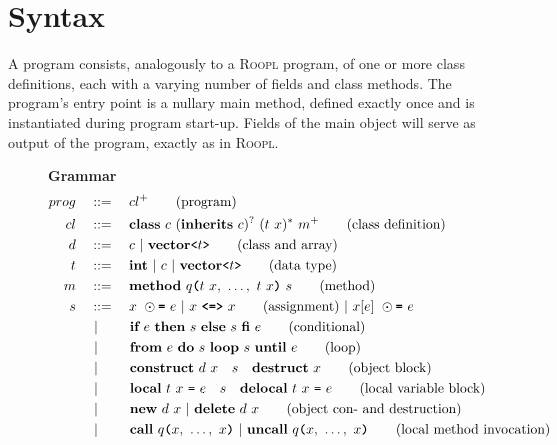 \section{Syntax}
\label{sec:syntax}
A \rooplpp program consists, analogously to a \textsc{Roopl} program, of one or more class definitions, each with a varying number of fields and class methods. The program's entry point is a nullary main method, defined exactly once and is instantiated during program start-up. Fields of the main object will serve as output of the program, exactly as in \textsc{Roopl}.
\begin{figure}[h]
\centering
\vspace{3mm}
\textbf{\rooplpp Grammar}
\begin{align}
    prog		\quad&::= \quad cl^+ \tag{program}\\
    cl			\quad&::=\quad \textbf{class}\ c\ (\textbf{inherits}\ c)^?\ (t\ x)^*\ m^+\tag{class definition}\\
    d           \quad&::=\quad c\ |\ \textbf{vector}\texttt{<}t\texttt{>} \tag{class and array}\\
    t			\quad&::=\quad \textbf{int}\ |\ c\ |\ \textbf{vector}\texttt{<}t\texttt{>} \tag{data type}\\
    m			\quad&::=\quad \textbf{method}\ q\textbf{\texttt{(}}t\ x,\ \dots,\ t\ x\textbf{\texttt{)}}\ s\tag{method}\\
    s			\quad&::=\quad x\ \odot\textbf{\texttt{=}}\ e\ |\ x\ \textbf{\texttt{<=>}}\ x\tag{assignment}\ |\ x[e]\ \odot\textbf{\texttt{=}}\ e\\\
    			&\ |\ \qquad \textbf{if}\ e\ \textbf{then}\ s\ \textbf{else}\ s\ \textbf{fi}\ e\tag{conditional}\\
    			&\ |\ \qquad \textbf{from}\ e\ \textbf{do}\ s\ \textbf{loop}\ s\ \textbf{until}\ e\tag{loop}\\
                &\ |\ \qquad \textbf{construct}\ d\ x\quad s\quad\textbf{destruct}\ x\tag{object block}\\
                &\ |\ \qquad \textbf{local}\ t\ x\ \texttt{=}\ e\quad s\quad\textbf{delocal}\ t\ x\ \texttt{=}\ e\tag{local variable block}\\
    			&\ |\ \qquad \textbf{new}\ d\ x\ |\ \textbf{delete}\ d\ x \tag{object con- and destruction}\\
    			&\ |\ \qquad \textbf{call}\ q\textbf{\texttt{(}}x,\ \dots,\ x\textbf{\texttt{)}}\ |\ \textbf{uncall}\ q\textbf{\texttt{(}}x,\ \dots,\ x\textbf{\texttt{)}}\tag{local method invocation}\\

\end{align}
\end{figure}
